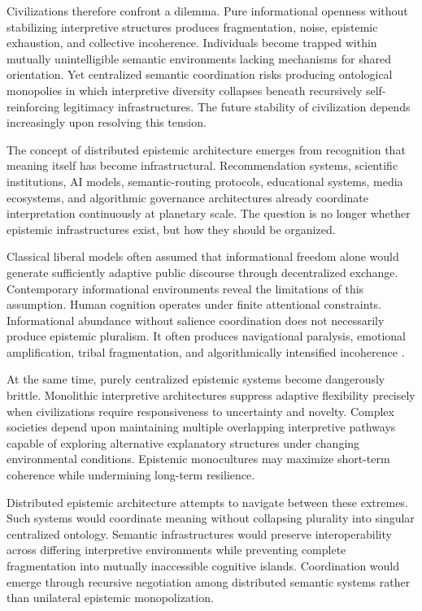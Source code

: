 \documentclass[11pt,a4paper]{article}
\begin{document}
Civilizations therefore confront a dilemma. Pure informational openness without stabilizing interpretive structures produces fragmentation, noise, epistemic exhaustion, and collective incoherence. Individuals become trapped within mutually unintelligible semantic environments lacking mechanisms for shared orientation. Yet centralized semantic coordination risks producing ontological monopolies in which interpretive diversity collapses beneath recursively self-reinforcing legitimacy infrastructures. The future stability of civilization depends increasingly upon resolving this tension.

The concept of distributed epistemic architecture emerges from recognition that meaning itself has become infrastructural. Recommendation systems, scientific institutions, AI models, semantic-routing protocols, educational systems, media ecosystems, and algorithmic governance architectures already coordinate interpretation continuously at planetary scale. The question is no longer whether epistemic infrastructures exist, but how they should be organized.

Classical liberal models often assumed that informational freedom alone would generate sufficiently adaptive public discourse through decentralized exchange. Contemporary informational environments reveal the limitations of this assumption. Human cognition operates under finite attentional constraints. Informational abundance without salience coordination does not necessarily produce epistemic pluralism. It often produces navigational paralysis, emotional amplification, tribal fragmentation, and algorithmically intensified incoherence \cite{zuboff2019}.

At the same time, purely centralized epistemic systems become dangerously brittle. Monolithic interpretive architectures suppress adaptive flexibility precisely when civilizations require responsiveness to uncertainty and novelty. Complex societies depend upon maintaining multiple overlapping interpretive pathways capable of exploring alternative explanatory structures under changing environmental conditions. Epistemic monocultures may maximize short-term coherence while undermining long-term resilience.

Distributed epistemic architecture attempts to navigate between these extremes. Such systems would coordinate meaning without collapsing plurality into singular centralized ontology. Semantic infrastructures would preserve interoperability across differing interpretive environments while preventing complete fragmentation into mutually inaccessible cognitive islands. Coordination would emerge through recursive negotiation among distributed semantic systems rather than unilateral epistemic monopolization.
\end{document}

